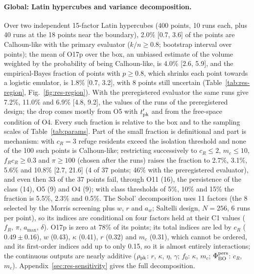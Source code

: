 \paragraph{Global: Latin hypercubes and variance decomposition.}
Over two independent 15-factor Latin hypercubes (400 points, 10 runs each, plus 40 runs at the 18 points near the
boundary), 2.0\% [0.7, 3.6] of the points are Calhoun-like with the primary evaluator ($k/n\ge0.8$; bootstrap
interval over points); the mean of O17p over the box, an unbiased estimate of the volume weighted by the
probability of being Calhoun-like, is 4.0\% [2.6, 5.9], and the empirical-Bayes fraction of points with $p\ge0.8$,
which shrinks each point towards a logistic emulator, is 1.8\% [0.7, 3.2], with 8 points still uncertain
(Table~\ref{tab:res-region}, Fig.~\ref{fig:res-region}). With the preregistered evaluator the same runs give 7.2\%,
11.0\% and 6.9\% [4.8, 9.2], the values of the runs of the preregistered design; the drop comes mostly from O5 with $t'_{\rm pk}$ and from the
free-space condition of O4. Every such fraction is relative to the box and to the sampling scales of
Table~\ref{tab:params}. Part of the small fraction is definitional and part is mechanism: with $c_R=3$ refuge
residents exceed the isolation threshold and none of the 100 such points is Calhoun-like; restricting successively
to $c_R\le2$, $m_c\le10$, $f_Rc_R\ge0.3$ and $\pi\ge100$ (chosen after the runs) raises the fraction to 2.7\%, 3.1\%,
5.6\% and 10.8\% [2.7, 21.6] (4 of 37 points; 46\% with the preregistered evaluator), and even then 33 of the 37 points
fail, through O11 (16), the persistence of the class (14), O5 (9) and O4 (9); with class thresholds of 5\%, 10\% and
15\% the fraction is 5.5\%, 2.3\% and 0.5\%. The Sobol' decomposition uses 11 factors (the 8 selected by the Morris
screening plus $w$, $r$ and $a_w$; Saltelli design, $N=256$, 6 runs per point), so its indices are conditional on
four factors held at their \textsf{C1} values ($f_R$, $\pi$, $a_{\max}$, $\delta$). O17p is zero at 78\% of its
points; its total indices are led by $c_R$ ($0.49\pm0.16$), $w$ (0.43), $\kappa$ (0.41), $r$ (0.32) and $m_c$ (0.31),
which cannot be ordered, and its first-order indices add up to only 0.15, so it is almost entirely interactions;
the continuous outputs are nearly additive ($\rho_{\rm pk}$: $r$, $\kappa$, $\eta$, $\gamma$; $f_0$: $\kappa$, $m_c$;
$\Phi^{\rm pers}_{\rm BO}$: $c_R$, $m_c$). Appendix~\ref{sec:res-sensitivity} gives the full decomposition.
